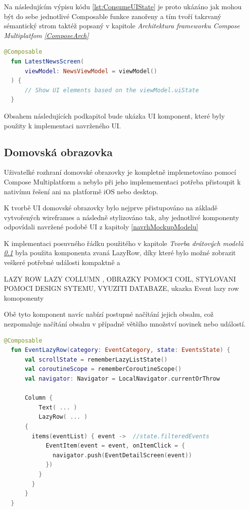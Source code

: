 Na následujícím výpisu kódu \ref{lst:ConsumeUIState} je proto ukázáno jak mohou být do sebe jednotlivé Composable funkce zanořeny a tím tvoří
takzvaný sémantický strom taktéž popsaný v kapitole \textit{Architektura frameworku Compose Multiplatfom \ref{ComposeArch}}

\begin{lstlisting}[caption={Popis UI widgetů pomocí jazyka Kotlin}, label={lst:ConsumeUIState}, language=Kotlin]
  @Composable
  fun LatestNewsScreen(
      viewModel: NewsViewModel = viewModel()
  ) {
      // Show UI elements based on the viewModel.uiState
  }
\end{lstlisting}




Obsahem následujících podkapitol bude ukázka UI komponent, které byly použity k implementaci navrženého UI.

\subsection{Domovská obrazovka}
Uživatelké rozhraní domovské obrazovky je kompletně implemetováno pomocí Compose Multiplatform a nebylo při jeho implemementaci potřeba
přistoupit k nativímu řešení ani na platformě iOS nebo desktop. 

K tvorbě UI domovské obrazovky bylo nejprve přistupováno na základě vytvořených wireframes a následně stylizováno tak, aby 
jednotlivé komponenty odpovídali navržené podobě UI z kapitoly \ref{navrhMockupModelu}

K implementaci posuvného řádku použitého v kapitole \textit{Tvorba drátových modelů \ref{}} byla použita komponenta zvaná LazyRow,
díky které bylo možné zobrazit veškeré potřebné události kompaktně a 

LAZY ROW LAZY COLLUMN , OBRAZKY POMOCI COIL, STYLOVANI POMOCI DESIGN SYTEMU, VYUZITI DATABAZE, ukazka Event lazy row komoponenty

Obě tyto komponent navíc nabízí postupné načítání jejich obsahu, což nezpomaluje načítání obsahu v případně většího množství novinek
nebo událostí.

\begin{lstlisting}[caption={Coil}, label={lst:Coil3}, language=Kotlin]
  @Composable
  fun EventLazyRow(category: EventCategory, state: EventsState) {
      val scrollState = rememberLazyListState()
      val coroutineScope = rememberCoroutineScope()
      val navigator: Navigator = LocalNavigator.currentOrThrow
  
      Column {
          Text( ... )
          LazyRow( ... ) 
      {  
        items(eventList) { event ->  //state.filteredEvents
            EventItem(event = event, onItemClick = {
              navigator.push(EventDetailScreen(event))
            })
          }
        }
      }
  }
\end{lstlisting}

